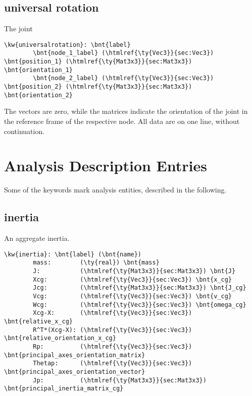 \subsection{universal rotation}
The  joint
\begin{Verbatim}[commandchars=\\\{\}]
    \kw{universalrotation}: \bnt{label}
        \bnt{node_1_label} (\htmlref{\ty{Vec3}}{sec:Vec3}) \bnt{position_1} (\htmlref{\ty{Mat3x3}}{sec:Mat3x3}) \bnt{orientation_1}
        \bnt{node_2_label} (\htmlref{\ty{Vec3}}{sec:Vec3}) \bnt{position_2} (\htmlref{\ty{Mat3x3}}{sec:Mat3x3}) \bnt{orientation_2}
\end{Verbatim}
The  vectors are zero,
while the  matrices indicate the orientation of the joint
in the reference frame of the respective node.
All data are on one line, without continuation.


\section{Analysis Description Entries}
Some of the keywords mark analysis entities, described in the following.

\subsection{inertia}
An aggregate inertia.
\begin{Verbatim}[commandchars=\\\{\}]
    \kw{inertia}: \bnt{label} (\bnt{name})
        mass:        (\ty{real}) \bnt{mass}
        J:           (\htmlref{\ty{Mat3x3}}{sec:Mat3x3}) \bnt{J}
        Xcg:         (\htmlref{\ty{Vec3}}{sec:Vec3}) \bnt{x_cg}
        Jcg:         (\htmlref{\ty{Mat3x3}}{sec:Mat3x3}) \bnt{J_cg}
        Vcg:         (\htmlref{\ty{Vec3}}{sec:Vec3}) \bnt{v_cg}
        Wcg:         (\htmlref{\ty{Vec3}}{sec:Vec3}) \bnt{omega_cg}
        Xcg-X:       (\htmlref{\ty{Vec3}}{sec:Vec3}) \bnt{relative_x_cg}
        R^T*(Xcg-X): (\htmlref{\ty{Vec3}}{sec:Vec3}) \bnt{relative_orientation_x_cg}
        Rp:          (\htmlref{\ty{Vec3}}{sec:Vec3}) \bnt{principal_axes_orientation_matrix}
        Thetap:      (\htmlref{\ty{Vec3}}{sec:Vec3}) \bnt{principal_axes_orientation_vector}
        Jp:          (\htmlref{\ty{Mat3x3}}{sec:Mat3x3}) \bnt{principal_inertia_matrix_cg}
\end{Verbatim}


